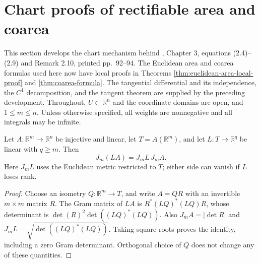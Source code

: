 \chapter{Chart proofs of rectifiable area and coarea}\label{sec:rectifiable-chart-integration}
This section develops the chart mechanism behind \cite{Sim18}, Chapter 3, equations (2.4)--(2.9) and Remark 2.10, printed pp.~92--94. The Euclidean area and coarea formulas used here now have local proofs in Theorems \ref{thm:euclidean-area-local-proof} and \ref{thm:coarea-formula}. The tangential differential and its independence, the $C^1$ decomposition, and the tangent theorem are supplied by the preceding development. Throughout, $U\subset\mathbb R^n$ and the coordinate domains are open, and $1\leq m\leq n$. Unless otherwise specified, all weights are nonnegative and all integrals may be infinite.

\begin{lemma}\label{lem:tangent-area-jacobian-chain}
Let $A:\mathbb R^m\to\mathbb R^n$ be injective and linear, let $T=A(\mathbb R^m)$, and let $L:T\to\mathbb R^q$ be linear with $q\geq m$. Then
\[
 J_m(LA)=J_mL\,J_mA.
\]
Here $J_mL$ uses the Euclidean metric restricted to $T$; either side can vanish if $L$ loses rank.
\end{lemma}
\begin{proof}
Choose an isometry $Q:\mathbb R^m\to T$, and write $A=QR$ with an invertible $m\times m$ matrix $R$. The Gram matrix of $LA$ is $R^*(LQ)^*(LQ)R$, whose determinant is $\det(R)^2\det((LQ)^*(LQ))$. Also $J_mA=|\det R|$ and $J_mL=\sqrt{\det((LQ)^*(LQ))}$. Taking square roots proves the identity, including a zero Gram determinant. Orthogonal choice of $Q$ does not change any of these quantities.
\end{proof}

